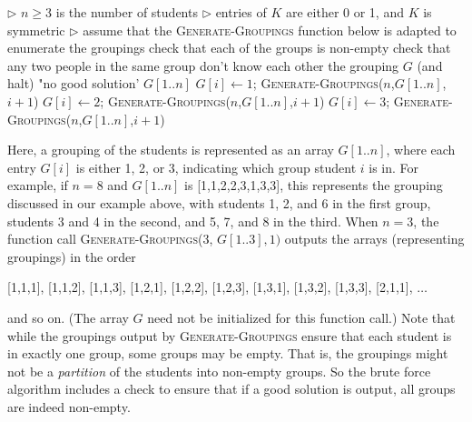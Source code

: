 \documentclass[11pt,fleqn]{exam}
\begin{document}
\vspace{.2in}

\begin{algorithmic}[1]
  \State $\triangleright$ $n \ge 3$ is the number of students
  \State $\triangleright$ entries of $K$ are either 0 or 1, and $K$ is symmetric
  \Statex
  \State $\triangleright$ assume that the \textsc{Generate-Groupings} function below is adapted to enumerate the groupings
  \State check that each of the groups is non-empty
  \State check that any two people in the same group don't know each other
   the grouping $G$ (and halt) 
  \EndIf
  \EndFor
   "no good solution'
  \EndFunction
  \State
  \Return $G[1..n]$
  \Else
  \State $G[i] \gets 1$; \textsc{Generate-Groupings}($n$,$G[1..n]$,$i+1$)
  \State $G[i] \gets 2$; \textsc{Generate-Groupings}($n$,$G[1..n]$,$i+1$)
  \State $G[i] \gets 3$; \textsc{Generate-Groupings}($n$,$G[1..n]$,$i+1$)
  \EndIf
  \EndFunction
\end{algorithmic}

\vspace{.2in}

\noindent
Here, a grouping of the students is represented as an array $G[1..n]$, where each entry $G[i]$ is either 1, 2, or 3, indicating which group student $i$ is in. For example, if $n = 8$ and $G[1..n]$ is [1,1,2,2,3,1,3,3], this represents the grouping discussed in our example above, with students 1, 2, and 6 in the first group, students 3 and 4 in the second, and 5, 7, and 8 in the third.
When $n=3$, the function call \textsc{Generate-Groupings}(3, $G[1..3], 1)$ outputs the arrays (representing groupings) in the order

  \vspace{.1in}

  \hspace{.5in} [1,1,1], [1,1,2], [1,1,3], [1,2,1], [1,2,2], [1,2,3], [1,3,1], [1,3,2], [1,3,3], [2,1,1], $\ldots$

  \vspace{.1in}

  \noindent
  and so on. (The array $G$ need not be initialized for this function call.)  Note that while the groupings output by \textsc{Generate-Groupings} ensure that each student is in exactly one group, some groups may be empty. That is, the groupings might not be a {\em partition} of the students into non-empty groups.  So the brute force algorithm includes a check to ensure that if a good solution is output, all groups are indeed non-empty.
\end{document}
